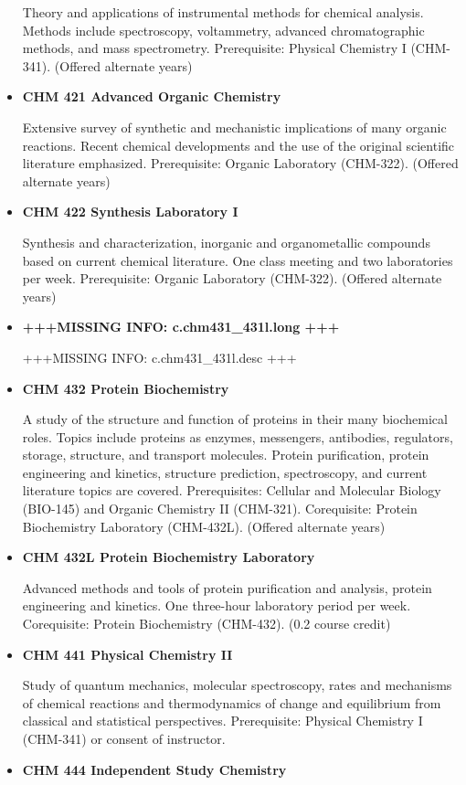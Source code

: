 \documentclass[
  letterpaper,
]{scrbook}
\begin{document}
\begin{itemize}
  Theory and applications of instrumental methods for chemical analysis.
  Methods include spectroscopy, voltammetry, advanced chromatographic
  methods, and mass spectrometry. Prerequisite: Physical Chemistry I
  (CHM-341). (Offered alternate years)
\item
  \textbf{CHM 421 Advanced Organic Chemistry}

  Extensive survey of synthetic and mechanistic implications of many
  organic reactions. Recent chemical developments and the use of the
  original scientific literature emphasized. Prerequisite: Organic
  Laboratory (CHM-322). (Offered alternate years)
\item
  \textbf{CHM 422 Synthesis Laboratory I}

  Synthesis and characterization, inorganic and organometallic compounds
  based on current chemical literature. One class meeting and two
  laboratories per week. Prerequisite: Organic Laboratory (CHM-322).
  (Offered alternate years)
\item
  \textbf{+++MISSING INFO: c.chm431\_431l.long +++}

  +++MISSING INFO: c.chm431\_431l.desc +++
\item
  \textbf{CHM 432 Protein Biochemistry}

  A study of the structure and function of proteins in their many
  biochemical roles. Topics include proteins as enzymes, messengers,
  antibodies, regulators, storage, structure, and transport molecules.
  Protein purification, protein engineering and kinetics, structure
  prediction, spectroscopy, and current literature topics are covered.
  Prerequisites: Cellular and Molecular Biology (BIO-145) and Organic
  Chemistry II (CHM-321). Corequisite: Protein Biochemistry Laboratory
  (CHM-432L). (Offered alternate years)
\item
  \textbf{CHM 432L Protein Biochemistry Laboratory}

  Advanced methods and tools of protein purification and analysis,
  protein engineering and kinetics. One three-hour laboratory period per
  week. Corequisite: Protein Biochemistry (CHM-432). (0.2 course credit)
\item
  \textbf{CHM 441 Physical Chemistry II}

  Study of quantum mechanics, molecular spectroscopy, rates and
  mechanisms of chemical reactions and thermodynamics of change and
  equilibrium from classical and statistical perspectives. Prerequisite:
  Physical Chemistry I (CHM-341) or consent of instructor.
\item
  \textbf{CHM 444 Independent Study Chemistry}


\end{itemize}
\end{document}
